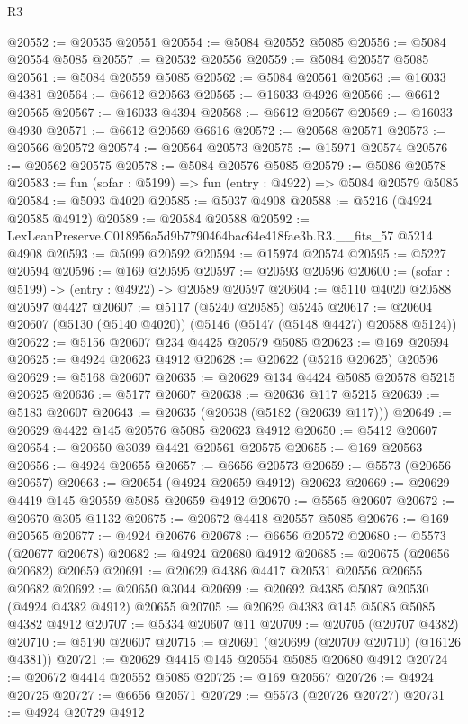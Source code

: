 \begin{lexlean}{R3}
\begin{coremodule}
@20552 := @20535 @20551
@20554 := @5084 @20552 @5085
@20556 := @5084 @20554 @5085
@20557 := @20532 @20556
@20559 := @5084 @20557 @5085
@20561 := @5084 @20559 @5085
@20562 := @5084 @20561
@20563 := @16033 @4381
@20564 := @6612 @20563
@20565 := @16033 @4926
@20566 := @6612 @20565
@20567 := @16033 @4394
@20568 := @6612 @20567
@20569 := @16033 @4930
@20571 := @6612 @20569 @6616
@20572 := @20568 @20571
@20573 := @20566 @20572
@20574 := @20564 @20573
@20575 := @15971 @20574
@20576 := @20562 @20575
@20578 := @5084 @20576 @5085
@20579 := @5086 @20578
@20583 := fun (sofar : @5199) => fun (entry : @4922) => @5084 @20579 @5085
@20584 := @5093 @4020
@20585 := @5037 @4908
@20588 := @5216 (@4924 @20585 @4912)
@20589 := @20584 @20588
@20592 := LexLeanPreserve.C018956a5d9b7790464bac64e418fae3b.R3.__fits_57 @5214 @4908
@20593 := @5099 @20592
@20594 := @15974 @20574
@20595 := @5227 @20594
@20596 := @169 @20595
@20597 := @20593 @20596
@20600 := (sofar : @5199) -> (entry : @4922) -> @20589 @20597
@20604 := @5110 @4020 @20588 @20597 @4427
@20607 := @5117 (@5240 @20585) @5245
@20617 := @20604 @20607 (@5130 (@5140 @4020)) (@5146 (@5147 (@5148 @4427) @20588 @5124))
@20622 := @5156 @20607 @234 @4425 @20579 @5085
@20623 := @169 @20594
@20625 := @4924 @20623 @4912
@20628 := @20622 (@5216 @20625) @20596
@20629 := @5168 @20607
@20635 := @20629 @134 @4424 @5085 @20578 @5215 @20625
@20636 := @5177 @20607
@20638 := @20636 @117 @5215
@20639 := @5183 @20607
@20643 := @20635 (@20638 (@5182 (@20639 @117)))
@20649 := @20629 @4422 @145 @20576 @5085 @20623 @4912
@20650 := @5412 @20607
@20654 := @20650 @3039 @4421 @20561 @20575
@20655 := @169 @20563
@20656 := @4924 @20655
@20657 := @6656 @20573
@20659 := @5573 (@20656 @20657)
@20663 := @20654 (@4924 @20659 @4912) @20623
@20669 := @20629 @4419 @145 @20559 @5085 @20659 @4912
@20670 := @5565 @20607
@20672 := @20670 @305 @1132
@20675 := @20672 @4418 @20557 @5085
@20676 := @169 @20565
@20677 := @4924 @20676
@20678 := @6656 @20572
@20680 := @5573 (@20677 @20678)
@20682 := @4924 @20680 @4912
@20685 := @20675 (@20656 @20682) @20659
@20691 := @20629 @4386 @4417 @20531 @20556 @20655 @20682
@20692 := @20650 @3044
@20699 := @20692 @4385 @5087 @20530 (@4924 @4382 @4912) @20655
@20705 := @20629 @4383 @145 @5085 @5085 @4382 @4912
@20707 := @5334 @20607 @11
@20709 := @20705 (@20707 @4382)
@20710 := @5190 @20607
@20715 := @20691 (@20699 (@20709 @20710) (@16126 @4381))
@20721 := @20629 @4415 @145 @20554 @5085 @20680 @4912
@20724 := @20672 @4414 @20552 @5085
@20725 := @169 @20567
@20726 := @4924 @20725
@20727 := @6656 @20571
@20729 := @5573 (@20726 @20727)
@20731 := @4924 @20729 @4912

\end{coremodule}
\end{lexlean}
